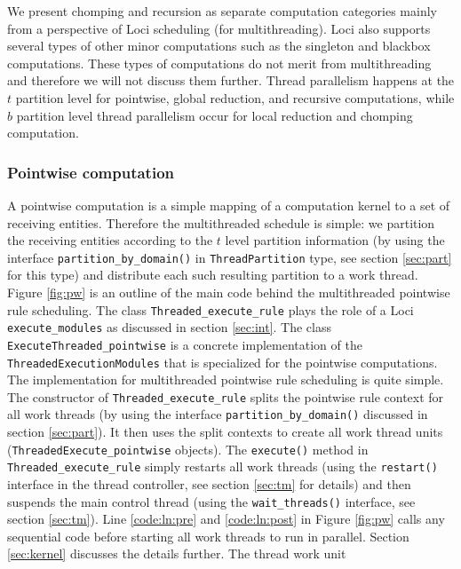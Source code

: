 \documentclass{article}
\begin{document}
We present chomping and recursion as separate computation categories
mainly from a perspective of Loci scheduling (for multithreading).
Loci also supports several types of other minor computations such as the
singleton and blackbox computations.  These types of computations do not
merit from multithreading and therefore we will not discuss them
further.  Thread parallelism happens at the $t$ partition level for
pointwise, global reduction, and recursive computations, while $b$
partition level thread parallelism occur for local reduction and
chomping computation.

\subsubsection{Pointwise computation}
\label{sec:pointwise}
A pointwise computation is a simple mapping of a computation kernel to a
set of receiving entities.  Therefore the multithreaded schedule is
simple: we partition the receiving entities according to the $t$ level
partition information (by using the interface
\lstinline{partition_by_domain()} in \lstinline{ThreadPartition} type,
see section \ref{sec:part} for this type) and distribute each such
resulting partition to a work thread.  Figure \ref{fig:pw} is an outline
of the main code behind the multithreaded pointwise rule scheduling.
The class \lstinline{Threaded_execute_rule} plays the role of a Loci
\lstinline{execute_modules} as discussed in section \ref{sec:int}.
The class \lstinline{ExecuteThreaded_pointwise} is a concrete
implementation of the \lstinline{ThreadedExecutionModules} that is
specialized for the pointwise computations.  The implementation for
multithreaded pointwise rule scheduling is quite simple.  The
constructor of \lstinline{Threaded_execute_rule} splits the pointwise
rule context for all work threads (by using the interface
\lstinline{partition_by_domain()} discussed in section \ref{sec:part}).
It then uses the split contexts to create all work thread units
(\lstinline{ThreadedExecute_pointwise} objects).  The
\lstinline{execute()} method in \lstinline{Threaded_execute_rule} simply
restarts all work threads (using the \lstinline{restart()} interface in
the thread controller, see section \ref{sec:tm} for details) and then
suspends the main control thread (using the \lstinline{wait_threads()}
interface, see section \ref{sec:tm}).  Line \ref{code:ln:pre} and
\ref{code:ln:post} in Figure \ref{fig:pw} calls any sequential code
before starting all work threads to run in parallel.  Section
\ref{sec:kernel} discusses the details further.  The thread work unit
\end{document}
